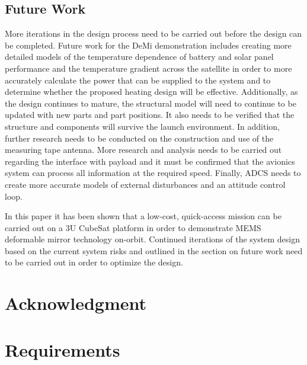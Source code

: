 \documentclass[12pt]{article}
\begin{document}
		\subsection{Future Work}

More iterations in the design process need to be carried out before the design can be completed.  Future work for the DeMi demonstration includes creating more detailed models of the temperature dependence of battery and solar panel performance and the temperature gradient across the satellite in order to more accurately calculate the power that can be supplied to the system and to determine whether the proposed heating design will be effective.  Additionally, as the design continues to mature, the structural model will need to continue to be updated with new parts and part positions.  It also needs to be verified that the structure and components will survive the launch environment. In addition, further research needs to be conducted on the construction and use of the measuring tape antenna.  More research and analysis needs to be carried out regarding the interface with payload and it must be confirmed that the avionics system can process all information at the required speed.  Finally, ADCS needs to create more accurate models of external disturbances and an attitude control loop.

In this paper it has been shown that a low-cost, quick-access mission can be carried out on a 3U CubeSat platform in order to demonstrate MEMS deformable mirror technology on-orbit.  Continued iterations of the system design based on the current system risks and outlined in the section on future work need to be carried out in order to optimize the design.

	

		
\FloatBarrier
\newpage

\section{Acknowledgment}
	
	
\FloatBarrier
\newpage
\appendix
\section{Requirements} \label{app:requirements}
\end{document}
